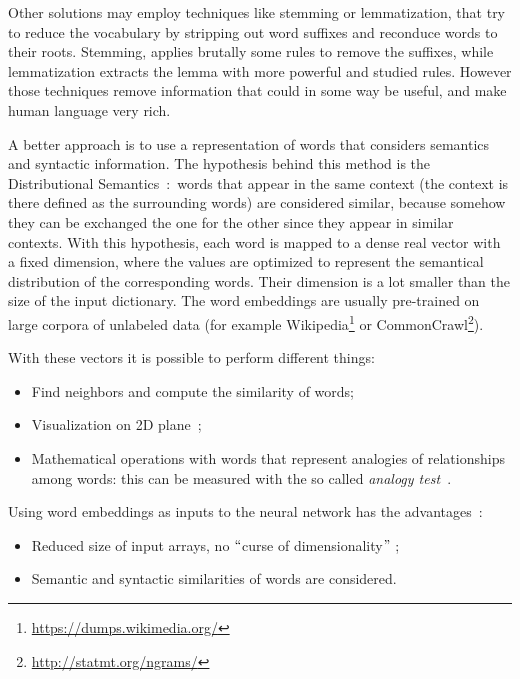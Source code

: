 Other solutions may employ techniques like stemming or lemmatization, that try to reduce the vocabulary by stripping out word suffixes and reconduce words to their roots. Stemming, applies brutally some rules to remove the suffixes, while lemmatization extracts the lemma with more powerful and studied rules. However those techniques remove information that could in some way be useful, and make human language very rich.

A better approach is to use a representation of words that considers semantics and syntactic information. The hypothesis behind this method is the Distributional Semantics~\cite{sahlgren2008distributional}:\ words that appear in the same context (the context is there defined as the surrounding words) are considered similar, because somehow they can be exchanged the one for the other since they appear in similar contexts. With this hypothesis, each word is mapped to a dense real vector with a fixed dimension,  where the values are optimized to represent the semantical distribution of the corresponding words. Their dimension is a lot smaller than the size of the input dictionary. The word embeddings are usually pre-trained on large corpora of unlabeled data (for example Wikipedia\footnote{\url{https://dumps.wikimedia.org/}} or CommonCrawl\footnote{\url{http://statmt.org/ngrams/}}).

With these vectors it is possible to perform different things:

\begin{itemize}
	\item Find neighbors and compute the similarity of words;

	\item Visualization on 2D plane~\cite{maaten2008visualizing};

	\item Mathematical operations with words that represent analogies of relationships among words: this can be measured with the so called \textit{analogy test~\cite{mikolov2013linguistic}}.
\end{itemize}

Using word embeddings as inputs to the neural network has the advantages~\cite{bengio2003neural}:

\begin{itemize}
	\item Reduced size of input arrays, no $``$curse of dimensionality$"$ ;

	\item Semantic and syntactic similarities of words are considered.
\end{itemize}

